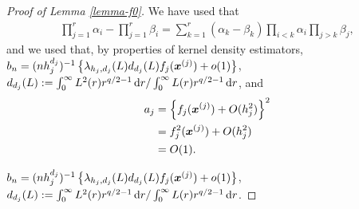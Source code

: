 \documentclass[oneside,11pt]{article}
\begin{document}
\begin{proof}[Proof of Lemma \ref{lemma-f0}]
We have used that
\begin{align*}
\prod_{j=1}^r \alpha_i-\prod_{j=1}^r \beta_i=\sum_{k=1}^r (\alpha_k-\beta_k)\prod_{i<k}\alpha_i\prod_{j>k}\beta_j,
\end{align*}
and we used that, by properties of kernel density estimators, $b_n = (n h_j^{d_j})^{-1} \left\{\lambda_{h_j,d_j}(L) d_{d_j}(L) f_j(\boldsymbol{x}^{(j)}) + o(1)\right\}$, $d_{d_j}(L) := \int_{0}^{\infty} L^2(r)r^{q/2-1} \,\mathrm{d} r / \int_{0}^{\infty} L(r)r^{q/2-1} \,\mathrm{d} r$, and
\begin{align*}
    a_j &= \left\{f_j(\boldsymbol{x}^{(j)})+O(h_j^2)\right\}^2 \\
    &= f_j^2(\boldsymbol{x}^{(j)})+O(h_j^2) \\
    &= O(1).
\end{align*}

$b_n = (n h_j^{d_j})^{-1} \left\{\lambda_{h_j,d_j}(L) d_{d_j}(L) f_j(\boldsymbol{x}^{(j)}) + o(1)\right\}$, $d_{d_j}(L) := \int_{0}^{\infty} L^2(r)r^{q/2-1} \,\mathrm{d} r / \int_{0}^{\infty} L(r)r^{q/2-1} \,\mathrm{d} r$.

\end{proof}
\end{document}
